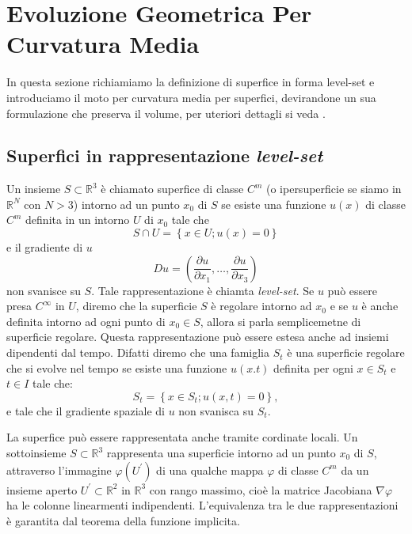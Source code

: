 \chapter{Evoluzione Geometrica Per Curvatura Media}
\label{cap:cap1}
In questa sezione richiamiamo la definizione di superfice in forma
level-set e introduciamo il moto per curvatura media per superfici,
devirandone un sua formulazione che preserva il volume, per uteriori
dettagli si veda \cite[][]{gui:sapiro,sapiro:tann}.
%
%
\section{Superfici in rappresentazione \emph{level-set}}
\label{sec:cp1-00}
Un insieme $S\subset\mathbb{R}^3$ è chiamato superfice di classe $C^m$ (o ipersuperficie se siamo in $\mathbb{R}^N$ con $N>3$) intorno ad un punto $x_0$ di $S$ se esiste una funzione $u(x)$ di classe $C^m$ definita in un intorno $U$ di $x_0$ tale che
\[
S\cap U=\left\{x\in U; u(x)=0\right\}
\]
e il gradiente di $u$
\[
 Du=\left(\frac{\partial u}{\partial x_1},\dots,\frac{\partial u}{\partial x_3}\right)
\]
non svanisce su $S$. Tale rappresentazione è chiamta \emph{level-set}. Se $u$ può essere presa $C^{\infty}$ in $U$, diremo che la superficie $S$ è regolare intorno ad $x_0$ e se $u$ è anche definita intorno ad ogni punto di $x_0\in S$, allora si parla semplicemetne di superficie regolare. Questa rappresentazione può essere estesa anche ad insiemi dipendenti dal tempo. Difatti diremo che una famiglia $S_t$ è una superficie regolare che si evolve nel tempo se esiste una funzione $u(x.t)$ definita per ogni $x\in S_t$ e $t\in I$ tale che:
\[
S_t=\left\{x\in S_t; u(x,t)=0\right\},
\]
e tale che il gradiente spaziale di $u$ non svanisca su $S_t$.
\begin{osservazione}
 La superfice può essere rappresentata anche tramite cordinate locali. Un sottoinsieme $S\subset\mathbb{R}^3$ rappresenta una superficie intorno ad un punto $x_0$ di $S$, attraverso l'immagine $\varphi(U^{'})$ di una qualche mappa $\varphi$ di classe $C^m$ da un insieme aperto $U^{'}\subset\mathbb{R}^2$ in $\mathbb{R}^3$ con rango massimo, cioè la matrice Jacobiana $\nabla\varphi$ ha le colonne linearmenti indipendenti.
L'equivalenza tra le due rappresentazioni è garantita dal teorema della funzione implicita.
\end{osservazione} 

